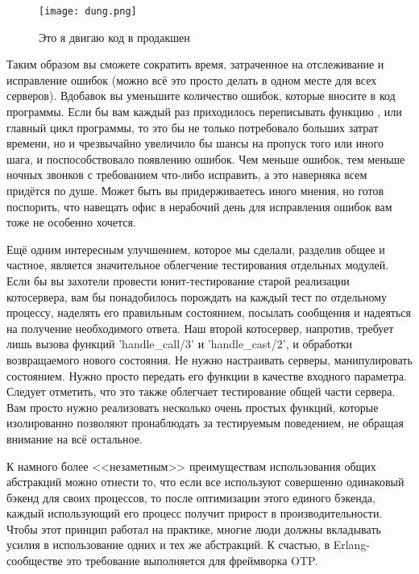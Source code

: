 \begin{wrapfigure}{r}{0.35\linewidth}
    \texttt{[image: dung.png]}
    \caption{Это я двигаю код в продакшен}
\end{wrapfigure}

Таким образом вы сможете сократить время, затраченное на отслеживание и исправление ошибок (можно всё это просто делать в одном месте для всех серверов).
Вдобавок вы уменьшите количество ошибок, которые вносите в код программы.
Если бы вам каждый раз приходилось переписывать функцию , или главный цикл программы, то это бы не только потребовало больших затрат времени, но и чрезвычайно увеличило бы шансы на пропуск того или иного шага, и поспособствовало появлению ошибок.
Чем меньше ошибок, тем меньше ночных звонков с требованием что\--либо исправить, а это наверняка всем придётся по душе.
Может быть вы придерживаетесь иного мнения, но готов поспорить, что навещать офис в нерабочий день для исправления ошибок вам тоже не особенно хочется.

Ещё одним интересным улучшением, которое мы сделали, разделив общее и частное, является значительное облегчение тестирования отдельных модулей.
Если бы вы захотели провести юнит\--тестирование старой реализации котосервера, вам бы понадобилось порождать на каждый тест по отдельному процессу, наделять его правильным состоянием, посылать сообщения и надеяться на получение необходимого ответа.
Наш второй котосервер, напротив, требует лишь вызова функций 'handle\_call/3' и 'handle\_cast/2', и обработки возвращаемого нового состояния.
Не нужно настраивать серверы, манипулировать состоянием.
Нужно просто передать его функции в качестве входного параметра.
Следует отметить, что это также облегчает тестирование общей части сервера.
Вам просто нужно реализовать несколько очень простых функций, которые изолированно позволяют пронаблюдать за тестируемым поведением, не обращая внимание на всё остальное.

К намного более <<незаметным>> преимуществам использования общих абстракций можно отнести то, что если все используют совершенно одинаковый бэкенд для своих процессов, то после оптимизации этого единого бэкенда, каждый использующий его процесс получит прирост в производительности.
Чтобы этот принцип работал на практике, многие люди должны вкладывать усилия в использование одних и тех же абстракций.
К счастью, в Erlang\--сообществе это требование выполняется для фреймворка OTP.

